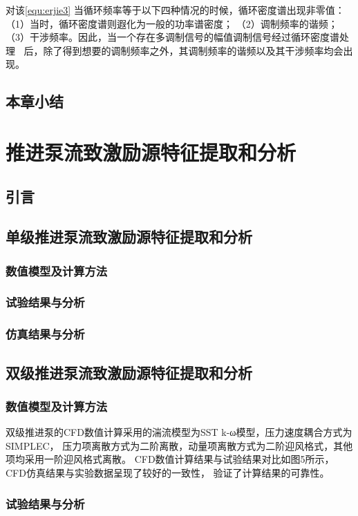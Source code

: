 对该\autoref{equ:erjie3}
当循环频率等于以下四种情况的时候，循环密度谱出现非零值：
（1）当时，循环密度谱则遐化为一般的功率谱密度；
（2）调制频率的谐频；
（3）干涉频率。因此，当一个存在多调制信号的幅值调制信号经过循环密度谱处理
后，除了得到想要的调制频率之外，其调制频率的谐频以及其干涉频率均会出现。


\section{本章小结}


\chapter{推进泵流致激励源特征提取和分析}
\section{引言}
\section{单级推进泵流致激励源特征提取和分析}
\subsection{数值模型及计算方法}

\subsection{试验结果与分析}
\subsection{仿真结果与分析}
\section{双级推进泵流致激励源特征提取和分析}
\subsection{数值模型及计算方法}
双级推进泵的CFD数值计算采用的湍流模型为SST k-ω模型，压力速度耦合方式为SIMPLEC，
压力项离散方式为二阶离散，动量项离散方式为二阶迎风格式，其他项均采用一阶迎风格式离散。
CFD数值计算结果与试验结果对比如图5所示，CFD仿真结果与实验数据呈现了较好的一致性，
验证了计算结果的可靠性。
\subsection{试验结果与分析}
